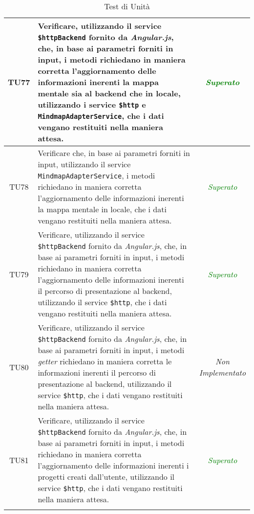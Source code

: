 \begin{longtable}{|c|>{}m{8cm}|c|}
\hypertarget{TU77}{TU77} & Verificare, utilizzando il service \texttt{\$httpBackend} fornito da \textit{Angular.js}, che, in base ai parametri forniti in input, i metodi richiedano  in maniera corretta l’aggiornamento delle informazioni inerenti la mappa mentale sia al backend che in locale, utilizzando i service \texttt{\$http} e \texttt{MindmapAdapterService}, che i dati vengano restituiti nella maniera attesa\finaleTestUnita{}. & \textcolor{Green}{\textit{Superato}}\\ \hline
\hypertarget{TU78}{TU78} & Verificare che, in base ai parametri forniti in input, utilizzando il service \texttt{MindmapAdapterService}, i metodi richiedano in maniera corretta l’aggiornamento delle informazioni inerenti la mappa mentale in locale, che i dati vengano restituiti nella maniera attesa\finaleTestUnita{}. & \textcolor{Green}{\textit{Superato}}\\ \hline
\hypertarget{TU79}{TU79} & Verificare, utilizzando il service \texttt{\$httpBackend} fornito da \textit{Angular.js}, che, in base ai parametri forniti in input, i metodi richiedano in maniera corretta l'aggiornamento delle informazioni inerenti il percorso di presentazione al backend, utilizzando il service \texttt{\$http}, che i dati vengano restituiti nella maniera attesa\finaleTestUnita{}. & \textcolor{Green}{\textit{Superato}}\\ \hline
\hypertarget{TU80}{TU80} & Verificare, utilizzando il service \texttt{\$httpBackend} fornito da \textit{Angular.js}, che, in base ai parametri forniti in input, i metodi \textit{getter} richiedano in maniera corretta le informazioni inerenti il percorso di presentazione al backend, utilizzando il service \texttt{\$http}, che i dati vengano restituiti nella maniera attesa\finaleTestUnita{}. & \textit{Non Implementato}\\ \hline
\hypertarget{TU81}{TU81} & Verificare, utilizzando il service \texttt{\$httpBackend} fornito da \textit{Angular.js}, che, in base ai parametri forniti in input, i metodi richiedano in maniera corretta l’aggiornamento delle informazioni inerenti i progetti creati dall’utente, utilizzando il service \texttt{\$http}, che i dati vengano restituiti nella maniera attesa\finaleTestUnita{}. & \textcolor{Green}{\textit{Superato}}\\ \hline
\caption[Test di Unità]{Test di Unità}
\label{tabella:test3}
\end{longtable}
\clearpage

